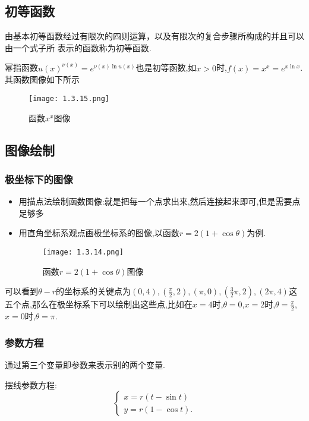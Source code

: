 \documentclass[12pt, a4paper, oneside, UTF8]{ctexbook}  %
\begin{document}
\subsection{初等函数}
由基本初等函数经过有限次的四则运算，以及有限次的复合步骤所构成的并且可以由一个式子所
表示的函数称为初等函数.
\begin{criterion}{}{}
    幂指函数$u(x)^{\nu(x)}=e^{\nu(x)\ln u(x)}$也是初等函数,如$x>0$时,$f(x)=x^x=e^{x\ln x}$.其函数图像如下所示
    \begin{figure}[H]
        \centering \texttt{[image: 1.3.15.png]} \caption{函数$x^x$图像}
    \end{figure}
\end{criterion}
\subsection{图像绘制}

\subsubsection{极坐标下的图像}

\begin{itemize}
    \item 用描点法绘制函数图像:就是把每一个点求出来,然后连接起来即可,但是需要点足够多
    \item 用直角坐标系观点画极坐标系的图像,以函数$r=2(1+\cos \theta )$为例.
          \begin{figure}[H]
              \centering \texttt{[image: 1.3.14.png]} \caption{函数$r=2(1+\cos \theta)$图像}
          \end{figure}
\end{itemize}
可以看到$\theta - r $的坐标系的关键点为$(0,4),(\frac{\pi}{2},2),(\pi,0),(\frac{3}{2}\pi,2),(2\pi,4)$这五个点,那么在极坐标系下可以绘制出这些点,比如在$x=4$时,$\theta = 0$,$x=2$时,$\theta = \frac{\pi}{2}$,$x=0$时,$\theta = \pi$.
\subsubsection{参数方程}
通过第三个变量即参数来表示别的两个变量.

摆线参数方程:
$$
    \left\{
    \begin{array}{l}
        x=r\left(t-\sin t\right) \\
        y=r\left(1-\cos t\right).
    \end{array}
    \right.
$$
\end{document}

